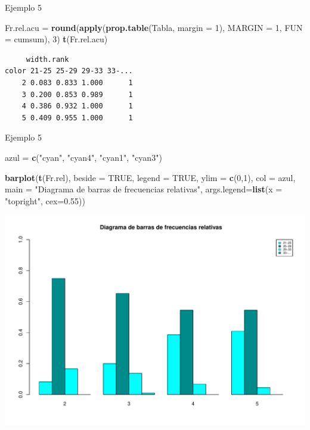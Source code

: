 \documentclass[
  ignorenonframetext,
]{beamer}
\newenvironment{Shaded}{\begin{snugshade}}{\end{snugshade}}
\newcommand{\AttributeTok}[1]{\textcolor[rgb]{0.13,0.29,0.53}{#1}}
\newcommand{\ConstantTok}[1]{\textcolor[rgb]{0.56,0.35,0.01}{#1}}
\newcommand{\DecValTok}[1]{\textcolor[rgb]{0.00,0.00,0.81}{#1}}
\newcommand{\FloatTok}[1]{\textcolor[rgb]{0.00,0.00,0.81}{#1}}
\newcommand{\FunctionTok}[1]{\textcolor[rgb]{0.13,0.29,0.53}{\textbf{#1}}}
\newcommand{\NormalTok}[1]{#1}
\newcommand{\OtherTok}[1]{\textcolor[rgb]{0.56,0.35,0.01}{#1}}
\newcommand{\StringTok}[1]{\textcolor[rgb]{0.31,0.60,0.02}{#1}}
\begin{document}
\begin{frame}[fragile]{Ejemplo 5}
\label{ejemplo-5-6}
\begin{Shaded}
\begin{Highlighting}[]
\NormalTok{Fr.rel.acu }\OtherTok{=} \FunctionTok{round}\NormalTok{(}\FunctionTok{apply}\NormalTok{(}\FunctionTok{prop.table}\NormalTok{(Tabla, }\AttributeTok{margin =} \DecValTok{1}\NormalTok{), }\AttributeTok{MARGIN =} \DecValTok{1}\NormalTok{, }\AttributeTok{FUN =}\NormalTok{ cumsum), }\DecValTok{3}\NormalTok{)}
\FunctionTok{t}\NormalTok{(Fr.rel.acu)}
\end{Highlighting}
\end{Shaded}

\begin{verbatim}
     width.rank
color 21-25 25-29 29-33 33-...
    2 0.083 0.833 1.000      1
    3 0.200 0.853 0.989      1
    4 0.386 0.932 1.000      1
    5 0.409 0.955 1.000      1
\end{verbatim}
\end{frame}

\begin{frame}[fragile]{Ejemplo 5}
\label{ejemplo-5-7}
\begin{Shaded}
\begin{Highlighting}[]
\NormalTok{azul }\OtherTok{=} \FunctionTok{c}\NormalTok{(}\StringTok{"cyan"}\NormalTok{, }\StringTok{"cyan4"}\NormalTok{, }\StringTok{"cyan1"}\NormalTok{, }\StringTok{"cyan3"}\NormalTok{)}

\FunctionTok{barplot}\NormalTok{(}\FunctionTok{t}\NormalTok{(Fr.rel), }\AttributeTok{beside =} \ConstantTok{TRUE}\NormalTok{, }\AttributeTok{legend =} \ConstantTok{TRUE}\NormalTok{, }\AttributeTok{ylim =} \FunctionTok{c}\NormalTok{(}\DecValTok{0}\NormalTok{,}\DecValTok{1}\NormalTok{), }\AttributeTok{col =}\NormalTok{ azul, }
        \AttributeTok{main =} \StringTok{"Diagrama de barras de frecuencias relativas"}\NormalTok{, }
        \AttributeTok{args.legend=}\FunctionTok{list}\NormalTok{(}\AttributeTok{x =} \StringTok{"topright"}\NormalTok{, }\AttributeTok{cex=}\FloatTok{0.55}\NormalTok{))}
\end{Highlighting}
\end{Shaded}

\includegraphics[width=0.8\linewidth]{R_base_files/figure-beamer/unnamed-chunk-133-1}
\end{frame}
\end{document}
